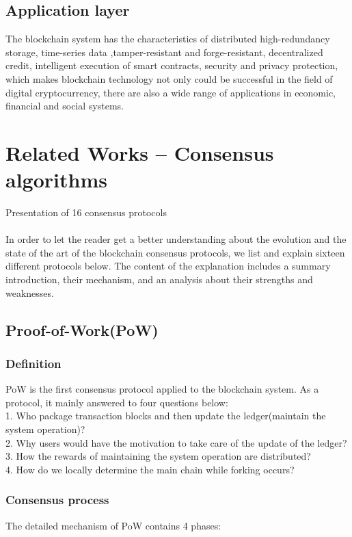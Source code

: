 \documentclass[doublespacing]{bmcart}
\begin{document}
\begin{CJK*}{UTF8}{gbsn}
\subsection{Application layer}
The blockchain system has the characteristics of distributed high-redundancy storage, time-series data ,tamper-resistant and forge-resistant, decentralized credit, intelligent execution of smart contracts, security and privacy protection, which makes blockchain technology not only could be successful in the field of digital cryptocurrency, there are also a wide range of applications in economic, financial and social systems.

\section{Related Works – Consensus algorithms}
Presentation of 16 consensus protocols
\paragraph{}
	In order to let the reader get a better understanding about the evolution and the state of the art of the blockchain consensus protocols, we list and explain sixteen different protocols below. The content of the explanation includes a summary introduction, their mechanism, and an analysis about their strengths and weaknesses.

	\subsection{Proof-of-Work(PoW)}
    \subsubsection*{Definition}
     PoW is the first consensus protocol applied to the blockchain system. As a protocol, it mainly answered to four questions below: 
    \\1. Who package transaction blocks and then update the ledger(maintain the system operation)?
    \\2. Why users would have the motivation to take care of the update of the ledger?
    \\3. How the rewards of maintaining the system operation are distributed?
    \\4. How do we locally determine the main chain while forking occurs?
    \subsubsection*{Consensus process}
    The detailed mechanism of PoW contains 4 phases:

\end{CJK*}
\end{document}
